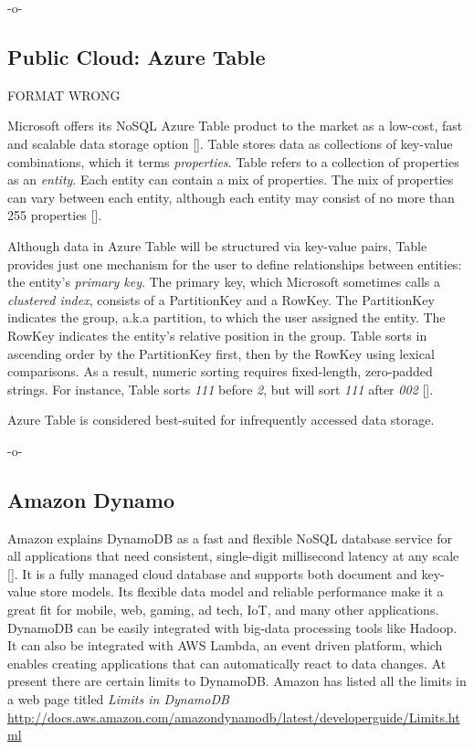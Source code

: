      -o-
     
\subsection{Public Cloud: Azure Table}

     FORMAT WRONG

Microsoft offers its NoSQL Azure Table product to the market as a
low-cost, fast and scalable data storage option
[\cite{www-what-to-use}]. Table stores data as collections of
key-value combinations, which it terms \textit{properties}.  Table
refers to a collection of properties as an \textit{entity}.  Each
entity can contain a mix of properties.  The mix of properties can
vary between each entity, although each entity may consist of no more
than 255 properties [\cite{www-blobqueuetable}].

Although data in Azure Table will be structured via key-value pairs,
Table provides just one mechanism for the user to define relationships
between entities: the entity's \textit{primary key}.  The primary key,
which Microsoft sometimes calls a \textit{clustered index}, consists
of a PartitionKey and a RowKey.  The PartitionKey indicates the group,
a.k.a partition, to which the user assigned the entity.  The RowKey
indicates the entity's relative position in the group.  Table sorts in
ascending order by the PartitionKey first, then by the RowKey using
lexical comparisons.  As a result, numeric sorting requires
fixed-length, zero-padded strings.  For instance, Table sorts
\textit{111} before \textit{2}, but will sort \textit{111} after
\textit{002} [\cite{www-scalable-partitioning}].

Azure Table is considered best-suited for infrequently accessed data
storage.

     -o-

\subsection{Amazon Dynamo}

Amazon explains DynamoDB as a fast and flexible NoSQL database service
for all applications that need consistent, single-digit millisecond
latency at any scale [\cite{www.dyndb}].  It is a fully managed cloud
database and supports both document and key-value store models.  Its
flexible data model and reliable performance make it a great fit for
mobile, web, gaming, ad tech, IoT, and many other applications.
DynamoDB can be easily integrated with big-data processing tools like
Hadoop. It can also be integrated with AWS Lambda, an event driven
platform, which enables creating applications that can automatically
react to data changes. At present there are certain limits to
DynamoDB. Amazon has listed all the limits in a web page titled
\textit{Limits in DynamoDB }
\url{http://docs.aws.amazon.com/amazondynamodb/latest/developerguide/Limits.html}

